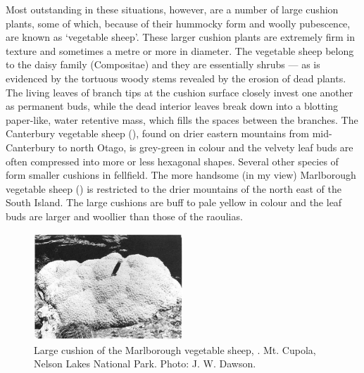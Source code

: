 Most outstanding in these situations, however, are a number of large cushion plants, some of which, because of their hummocky form and woolly pubescence, are known as `vegetable sheep'.
These larger cushion plants are extremely firm in texture and sometimes a metre or more in diameter.
The vegetable sheep belong to the daisy family (Compositae) and they are essentially shrubs --- as is evidenced by the tortuous woody stems revealed by the erosion of dead plants.
The living leaves of branch tips at the cushion surface closely invest one another as permanent buds, while the dead interior leaves break down into a blotting paper-like, water retentive mass, which fills the spaces between the branches.
The Canterbury vegetable sheep (), found on drier eastern mountains from mid-Canterbury to north Otago, is grey-green in colour and the velvety leaf buds are often compressed into more or less hexagonal shapes.
Several other species of  form smaller cushions in fellfield.
The more handsome (in my view) Marlborough vegetable sheep () is restricted to the drier mountains of the north east of the South Island.
The large cushions are buff to pale yellow in colour and the leaf buds are larger and woollier than those of the raoulias.

\begin{figure}
	\includegraphics[width=0.5\textwidth]{graphics/figure108vegetable-sheep.jpg}
	\centering
	\caption[Large cushion of the Marlborough vegetable sheep]{Large cushion of the Marlborough vegetable sheep, .
	Mt. Cupola, Nelson Lakes National Park.
	Photo: J. W. Dawson.}%
	\label{fig:108vegetable-sheep}
\end{figure}

